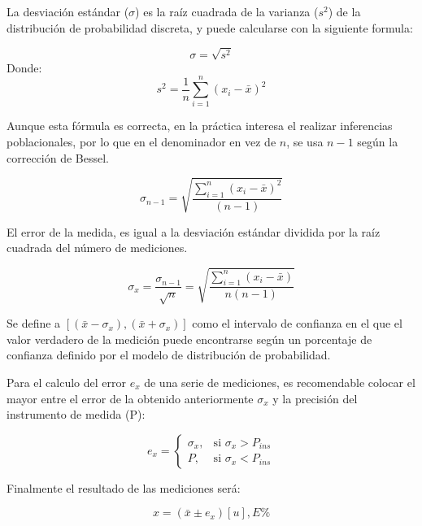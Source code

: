 \documentclass[letter,11pt]{article}
\begin{document}
La desviación estándar ($\sigma$) es la raíz cuadrada de la varianza ($s^2$) de
la distribución de probabilidad discreta, y puede calcularse con la siguiente
formula:

\begin{equation}
    \sigma = \sqrt{s^2}
\end{equation}
Donde:
\begin{equation}
    s^2 = \frac{1}{n}\sum_{i=1}^{n} (x_i-\bar{x})^2
\end{equation}

Aunque esta fórmula es correcta, en la práctica interesa el realizar inferencias
poblacionales, por lo que en el denominador en vez de $n$, se usa $n-1$ según la
corrección de Bessel.

\begin{equation}
    \sigma_{n-1} = \sqrt{\frac{\sum_{i=1}^{n} (x_i-\bar{x})^2}{(n-1)}}
\end{equation}

El error de la medida, es igual a la desviación estándar dividida por la raíz
cuadrada del número de mediciones.

\begin{equation}
    \sigma_x = \frac{\sigma_{n-1}}{\sqrt{n}}
             = \sqrt{\frac{\sum_{i=1}^{n} (x_i-\bar{x})}{n(n-1)}}
\end{equation}

Se define a $[(\bar{x}-\sigma_x), (\bar{x}+\sigma_x)]$ como el intervalo de
confianza en el que el valor verdadero de la medición puede encontrarse según un
porcentaje de confianza definido por el modelo de distribución de probabilidad.

Para el calculo del error $e_x$ de una serie de mediciones, es recomendable
colocar el mayor entre el error de la obtenido anteriormente $\sigma_x$ y la
precisión del instrumento de medida (P):

\begin{equation}
    e_x = \begin{cases}
        \sigma_x, & \mbox{si }\sigma_x > P_{ins} \\
        P,        & \mbox{si }\sigma_x < P_{ins}
    \end{cases}
\end{equation}

Finalmente el resultado de las mediciones será:

\begin{equation}
    x = (\bar{x}\pm e_x)[u], E\%
\end{equation}
\end{document}
